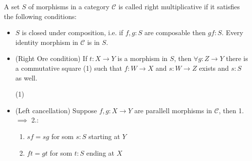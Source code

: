     \begin{definition}
        A set $S$ of morphisms in a category $\mathcal{C}$ is called right multiplicative if it satisfies the following conditions:
        \begin{itemize}
            \item $S$ is closed under composition, i.e. if $f,g : S$ are composable then $gf : S$. Every identity morphism in $\mathcal{C}$ is in $S$.
            \item (Right Ore condition) If $t : X \rightarrow Y$ is a morphism in $S$, then $\forall g:Z\rightarrow Y$ there is a commutative square (1) such that $f:W\rightarrow X$ and $s:W\rightarrow Z$ exists and $s:S$ as well.
            \begin{center}
                (1)
            \end{center}
            \item (Left cancellation) Suppose $f,g:X\rightarrow Y$ are parallell morphisms in $\mathcal{C}$, then 1. $\implies$ 2.:
            \begin{enumerate}
                \item $sf = sg$ for som $s:S$ starting at $Y$
                \item $ft = gt$ for som $t:S$ ending at $X$
            \end{enumerate}
        \end{itemize}
    \end{definition}


